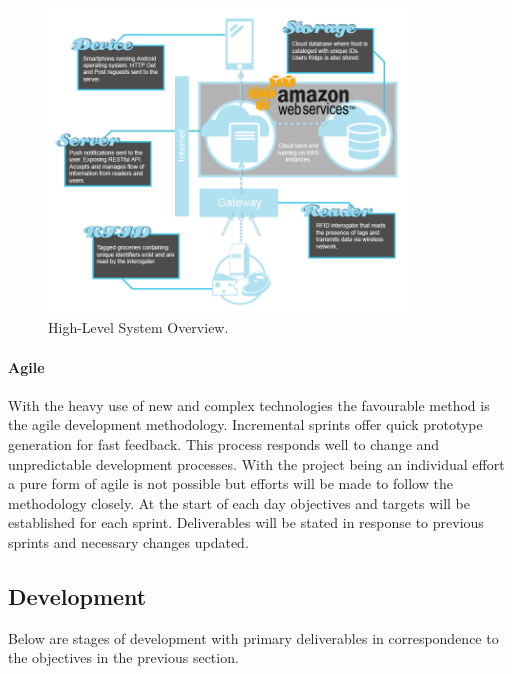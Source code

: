 \documentclass[a4paper, 11pt]{article}
\begin{document}
\begin{figure}[h!]
  \centering
    \includegraphics[width=0.85\textwidth]{system6.png}
      \caption{High-Level System Overview.}
\end{figure}

  \vspace{\baselineskip}

\paragraph{Agile}With the heavy use of new and complex technologies the favourable method is the agile development methodology. Incremental sprints offer quick prototype generation for fast feedback. This process responds well to change and unpredictable development processes. With the project being an individual effort a pure form of agile is not possible but efforts will be made to follow the methodology closely. At the start of each day objectives and targets will be established for each sprint. Deliverables will be stated in response to previous sprints and necessary changes updated.

\subsection{Development}
Below are stages of development with primary deliverables in correspondence to the objectives in the previous section.
\end{document}
